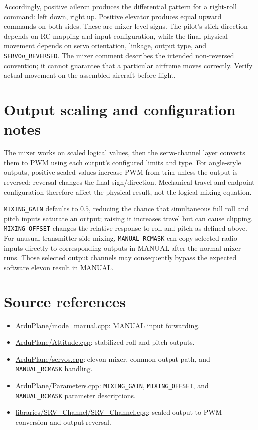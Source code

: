 \documentclass[11pt]{article}
\begin{document}
Accordingly, positive aileron produces the differential pattern for a
right-roll command: left down, right up. Positive elevator produces equal
upward commands on both sides. These are mixer-level signs. The pilot's stick
direction depends on RC mapping and input configuration, while the final
physical movement depends on servo orientation, linkage, output type, and
\texttt{SERVO\textit{n}\_REVERSED}. The mixer comment describes the intended
non-reversed convention; it cannot guarantee that a particular airframe moves
correctly. Verify actual movement on the assembled aircraft before flight.

\section{Output scaling and configuration notes}

The mixer works on scaled logical values, then the servo-channel layer converts
them to PWM using each output's configured limits and type. For angle-style
outputs, positive scaled values increase PWM from trim unless the output is
reversed; reversal changes the final sign/direction. Mechanical travel and
endpoint configuration therefore affect the physical result, not the
logical mixing equation.

\texttt{MIXING\_GAIN} defaults to \(0.5\), reducing the chance that simultaneous
full roll and pitch inputs saturate an output; raising it increases travel but
can cause clipping. \texttt{MIXING\_OFFSET} changes the relative response to
roll and pitch as defined above. For unusual transmitter-side mixing,
\texttt{MANUAL\_RCMASK} can copy selected radio inputs directly to corresponding
outputs in MANUAL after the normal mixer runs. Those selected output channels
may consequently bypass the expected software elevon result in MANUAL.

\section{Source references}

\begin{itemize}
  \item \url{ArduPlane/mode_manual.cpp}: MANUAL input forwarding.
  \item \url{ArduPlane/Attitude.cpp}: stabilized roll and pitch outputs.
  \item \url{ArduPlane/servos.cpp}: elevon mixer, common output path, and
  \texttt{MANUAL\_RCMASK} handling.
  \item \url{ArduPlane/Parameters.cpp}: \texttt{MIXING\_GAIN},
  \texttt{MIXING\_OFFSET}, and \texttt{MANUAL\_RCMASK} parameter descriptions.
  \item \url{libraries/SRV\_Channel/SRV\_Channel.cpp}: scaled-output to PWM
  conversion and output reversal.
\end{itemize}
\end{document}
